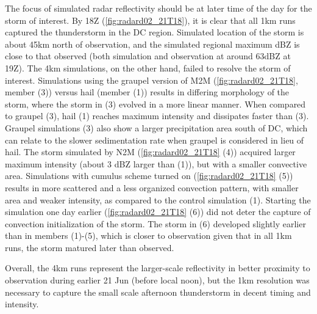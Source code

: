 The focus of simulated radar reflectivity should be at later time of the day for the storm of interest. By 18Z (\ref{fig:radard02_21T18}), it is clear that all 1km runs captured the thunderstorm in the DC region. Simulated location of the storm is about 45km north of observation, and the simulated regional maximum dBZ is close to that observed (both simulation and observation at around 63dBZ at 19Z). The 4km simulations, on the other hand, failed to resolve the storm of interest. Simulations using the graupel version of M2M (\ref{fig:radard02_21T18}, member (3)) versus hail (member (1)) results in differing morphology of the storm, where the storm in (3) evolved in a more linear manner. When compared to graupel (3), hail (1) reaches maximum intensity and dissipates faster than (3). Graupel simulations (3) also show a larger precipitation area south of DC, which can relate to the slower sedimentation rate when graupel is considered in lieu of hail. The storm simulated by N2M (\ref{fig:radard02_21T18} (4)) acquired larger maximum intensity (about 3 dBZ larger than (1)), but with a smaller convective area. Simulations with cumulus scheme turned on (\ref{fig:radard02_21T18} (5)) results in more scattered and a less organized convection pattern, with smaller area and weaker intensity, as compared to the control simulation (1). Starting the simulation one day earlier (\ref{fig:radard02_21T18} (6)) did not deter the capture of convection initialization of the storm. The storm in (6) developed slightly earlier than in members (1)-(5), which is closer to observation given that in all 1km runs, the storm matured later than observed. 

Overall, the 4km runs represent the larger-scale reflectivity in better proximity to observation during earlier 21 Jun (before local noon), but the 1km resolution was necessary to capture the small scale afternoon thunderstorm in decent timing and intensity.

